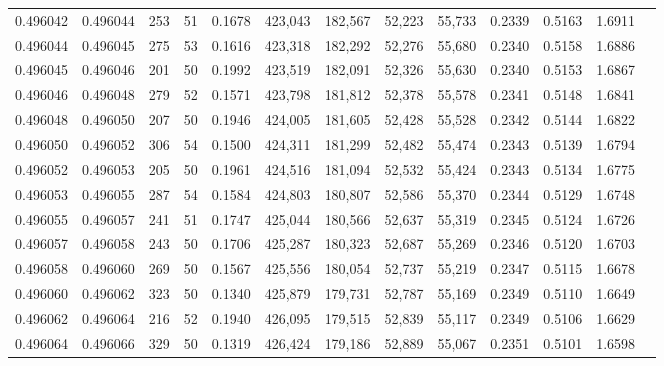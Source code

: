 \begin{tabular}{rrrrrrrrrrrrr}
0.496042 & 0.496044 &   253 &  51 &                                     0.1678 & 423,043 & 182,567 &  52,223 &  55,733 & 0.2339 & 0.5163 & 1.6911 \\
0.496044 & 0.496045 &   275 &  53 &                                     0.1616 & 423,318 & 182,292 &  52,276 &  55,680 & 0.2340 & 0.5158 & 1.6886 \\
0.496045 & 0.496046 &   201 &  50 &                                     0.1992 & 423,519 & 182,091 &  52,326 &  55,630 & 0.2340 & 0.5153 & 1.6867 \\
0.496046 & 0.496048 &   279 &  52 &                                     0.1571 & 423,798 & 181,812 &  52,378 &  55,578 & 0.2341 & 0.5148 & 1.6841 \\
0.496048 & 0.496050 &   207 &  50 &                                     0.1946 & 424,005 & 181,605 &  52,428 &  55,528 & 0.2342 & 0.5144 & 1.6822 \\
0.496050 & 0.496052 &   306 &  54 &                                     0.1500 & 424,311 & 181,299 &  52,482 &  55,474 & 0.2343 & 0.5139 & 1.6794 \\
0.496052 & 0.496053 &   205 &  50 &                                     0.1961 & 424,516 & 181,094 &  52,532 &  55,424 & 0.2343 & 0.5134 & 1.6775 \\
0.496053 & 0.496055 &   287 &  54 &                                     0.1584 & 424,803 & 180,807 &  52,586 &  55,370 & 0.2344 & 0.5129 & 1.6748 \\
0.496055 & 0.496057 &   241 &  51 &                                     0.1747 & 425,044 & 180,566 &  52,637 &  55,319 & 0.2345 & 0.5124 & 1.6726 \\
0.496057 & 0.496058 &   243 &  50 &                                     0.1706 & 425,287 & 180,323 &  52,687 &  55,269 & 0.2346 & 0.5120 & 1.6703 \\
0.496058 & 0.496060 &   269 &  50 &                                     0.1567 & 425,556 & 180,054 &  52,737 &  55,219 & 0.2347 & 0.5115 & 1.6678 \\
0.496060 & 0.496062 &   323 &  50 &                                     0.1340 & 425,879 & 179,731 &  52,787 &  55,169 & 0.2349 & 0.5110 & 1.6649 \\
0.496062 & 0.496064 &   216 &  52 &                                     0.1940 & 426,095 & 179,515 &  52,839 &  55,117 & 0.2349 & 0.5106 & 1.6629 \\
0.496064 & 0.496066 &   329 &  50 &                                     0.1319 & 426,424 & 179,186 &  52,889 &  55,067 & 0.2351 & 0.5101 & 1.6598 \\

\end{tabular}
